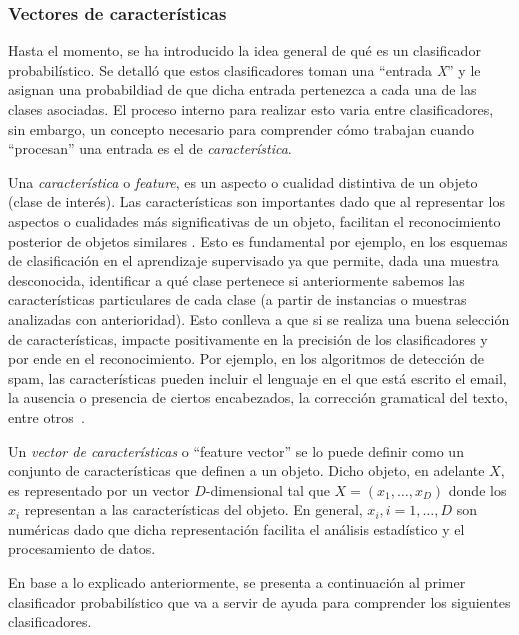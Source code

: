 \subsubsection{Vectores de características} \label{subsection:feature}
	
	Hasta el momento, se ha introducido la idea general de qué es un clasificador probabilístico. Se detalló que estos clasificadores toman una ``entrada \textit{X}'' y le asignan una probabildiad de que dicha entrada pertenezca a cada una de las clases asociadas. El proceso interno para realizar esto varia entre clasificadores, sin embargo, un concepto necesario para comprender cómo trabajan cuando ``procesan'' una entrada es el de \textit{característica}.

	Una \textit{característica} o \textit{feature}, es un aspecto o cualidad distintiva de un objeto (clase de interés). Las características son importantes dado que al re\-pre\-sen\-tar los aspectos o cualidades más significativas de un objeto, facilitan el reconocimiento posterior de objetos similares \cite{OIVIND95}. Esto es fundamental por ejemplo, en los esquemas de clasificación en el aprendizaje supervisado ya que permite, dada una muestra desconocida, identificar a qué clase pertenece si anteriormente sabemos las características particulares de cada clase (a partir de instancias o muestras analizadas con anterioridad). Esto conlleva a que si se realiza una buena selección de características, impacte positivamente en la precisión de los clasificadores y por ende en el reconocimiento. Por ejemplo, en los algoritmos de detección de spam, las características pueden incluir el lenguaje en el que está escrito el email, la ausencia o presencia de ciertos encabezados, la corrección gramatical del texto, entre otros~\cite{SpamPaper}.

	Un \textit{vector de características} o ``feature vector'' se lo puede definir como un conjunto de características que definen a un objeto. Dicho objeto, en adelante $X$, es representado por un vector $D$-dimensional tal que  $X=(x_1,\dots,x_D)$ donde los $x_i$ representan a las características del objeto. En general, $x_i, i=1,\dots,D$ son numéricas dado que dicha representación facilita el análisis estadístico y el procesamiento de datos.

	En base a lo explicado anteriormente, se presenta a continuación al primer clasificador probabilístico que va a servir de ayuda para comprender los siguientes clasificadores.
		
	
